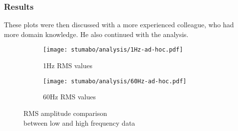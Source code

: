 \begin{frame}
    \frametitle{Results}
    \vspace*{\fill}
    These plots were then discussed with a more experienced colleague, who had more domain knowledge.
    He also continued with the analysis.
    \begin{figure}[htp]
        \begin{subfigure}{.495\textwidth}
            \texttt{[image: stumabo/analysis/1Hz-ad-hoc.pdf]}
            \caption{1Hz RMS values}
            \label{fig:stu_1Hz_rms}
        \end{subfigure}
        \begin{subfigure}{.495\textwidth}
            \texttt{[image: stumabo/analysis/60Hz-ad-hoc.pdf]}
            \caption{60Hz RMS values}
            \label{fig:stu_60Hz_rms}
        \end{subfigure}
        \caption{RMS amplitude comparison \\between low and high frequency data}
        \label{fig:stu_3_rms}
    \end{figure}

    \vspace*{\fill}
\end{frame}


